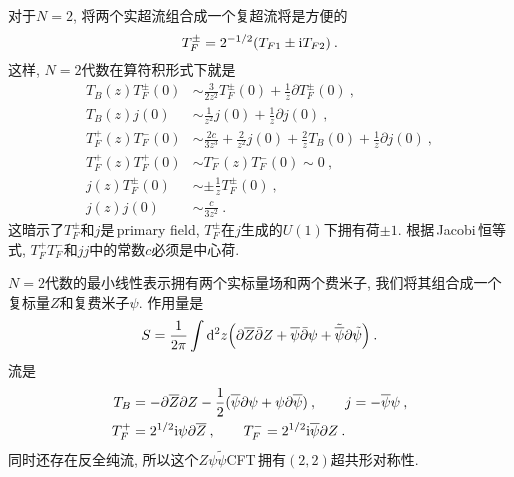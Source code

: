 对于$ N=2$, 将两个实超流组合成一个复超流将是方便的
\begin{equation}
    T_{F}^{\pm} = 2^{-1/2}(T_{F1}\pm \mathrm{i} T_{F2}) \:. \label{11.1.3}
\end{equation}
这样, $N=2 $代数在算符积形式下就是
\begin{subequations}
    \begin{align}
        T_{B}(z)T_{F}^{\pm}(0)&\sim \frac{3}{2z^{2}} T_{F}^{\pm}(0) + \frac{1}{z}\partial T_{F}^{\pm}(0)\:,\label{11.1.4a} \\
        T_{B}(z) j(0) &\sim \frac{1}{z^{2}} j(0) +\frac{1}{z}\partial j(0) \:, \label{11.1.4b} \\
        T_{F}^{+}(z)T_{F}^{-}(0)&\sim \frac{2c}{3z^{3}}+\frac{2}{z^{2}}j(0)+\frac{2}{z}T_{B}(0)+\frac{1}{z}\partial j(0) \:,\label{11.1.4c} \\
        T^{+}_{F}(z)T^{+}_{F}(0)& \sim T^{-}_{F}(z)T^{-}_{F}(0) \sim 0 \:, \label{11.1.4d} \\
        j(z)T_{F}^{\pm}(0) &\sim \pm \frac{1}{z} T_{F}^{\pm}(0) \:, \label{11.1.4e} \\
        j(z)j(0) &\sim \frac{c}{3z^{2}}\:. \label{11.1.4f}
    \end{align}
\end{subequations}
这暗示了$ T_{F}^{\pm} $和$ j $是\,primary field, $T_{F}^{\pm} $在$ j $生成的$ U(1) $下拥有荷$ \pm1$. 根据\,Jacobi\,恒等式, $T_{F}^{+}T_{F}^{-} $和$ jj $中的常数$ c $必须是中心荷.

$N=2 $代数的最小线性表示拥有两个实标量场和两个费米子, 我们将其组合成一个复标量$ Z $和复费米子$ \psi$. 作用量是
\begin{equation}
    S=\frac{1}{2\pi} \int \mathrm{d}^{2}z\Bigl( \partial \overline{Z}\bar{\partial}Z 
    +\overline{\psi}\bar{\partial}\psi + \tilde{\overline{\psi}}\partial\tilde{\psi}\Bigr)\:. \label{11.1.5}
\end{equation}
流是
\begin{subequations}
    \begin{align}
        T_{B} &= -\partial\overline{Z}\partial Z -\frac{1}{2}(\overline{\psi}\partial\psi+\psi\partial\overline{\psi})\:,\qquad j=-\overline{\psi}\psi \:,\label{11.1.6a} \\
        T_{F}^{+} &= 2^{1/2} \mathrm{i}\psi \partial\overline{Z} \:, \qquad 
        T_{F}^{-} = 2^{1/2} \mathrm{i}\overline{\psi} \partial Z\:. \label{11.1.6b}
    \end{align} \label{11.1.6}
\end{subequations}
同时还存在反全纯流, 所以这个$ Z\psi\tilde{\psi} $CFT\,拥有$(2,2)$超共形对称性.

